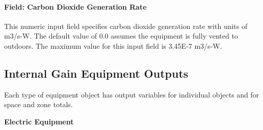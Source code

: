 \paragraph{Field: Carbon Dioxide Generation Rate}\label{field-carbon-dioxide-generation-rate-otherequip-other-definition}

This numeric input field specifies carbon dioxide generation rate with units of m3/s-W. The default value of 0.0 assumes the equipment is fully vented to outdoors. The maximum value for this input field is 3.45E-7 m3/s-W.

\subsection{Internal Gain Equipment Outputs}\label{outputs-5-004}

Each type of equipment object has output variables for individual objects and for space and zone totals.

\textbf{Electric Equipment}

